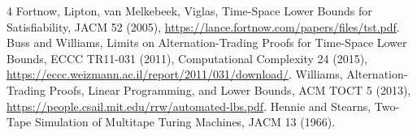 \documentclass[11pt]{article}
\begin{document}
\begin{thebibliography}{4}
 Fortnow, Lipton, van Melkebeek, Viglas,
Time-Space Lower Bounds for Satisfiability, JACM 52 (2005),
\url{https://lance.fortnow.com/papers/files/tst.pdf}.
 Buss and Williams,
Limits on Alternation-Trading Proofs for Time-Space Lower Bounds,
ECCC TR11-031 (2011), Computational Complexity 24 (2015),
\url{https://eccc.weizmann.ac.il/report/2011/031/download/}.
 Williams,
Alternation-Trading Proofs, Linear Programming, and Lower Bounds,
ACM TOCT 5 (2013),
\url{https://people.csail.mit.edu/rrw/automated-lbs.pdf}.
 Hennie and Stearns,
Two-Tape Simulation of Multitape Turing Machines, JACM 13 (1966).
\end{thebibliography}
\end{document}
